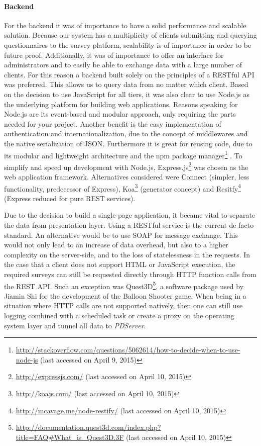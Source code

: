 	\paragraph{Backend}

		For the backend it was of importance to have a solid performance and scalable solution. Because our system has a multiplicity of clients submitting and querying questionnaires to the survey platform, scalability is of importance in order to be future proof. 		Additionally, it was of importance to offer an interface for administrators and to easily be able to exchange data with a large number of clients. For this reason a backend built solely on the principles of a RESTful API was preferred. This allows us to query data from no matter which client.
		Based on the decision to use JavaScript for all tiers, it was also clear to use Node.js as the underlying platform for building web applications. Reasons speaking for Node.js are its event-based and modular approach, only requiring the parts needed for your project. Another benefit is the easy implementation of authentication and internationalization, due to the concept of middlewares \cite{Heise2014RESTConnect} and the native serialization of JSON. Furthermore it is great for reusing code, due to its modular and lightweight architecture and the npm package manager\footnote{\url{http://stackoverflow.com/questions/5062614/how-to-decide-when-to-use-node-js} (last accessed on April 9, 2015)} \cite{Heise2014NodeProCon}. To simplify and speed up development with Node.js, Express.js\footnote{\url{http://expressjs.com/} (last accessed on April 10, 2015)} was chosen as the web application framework. Alternatives considered were Connect (simpler, less functionality, predecessor of Express), Koa\footnote{\url{http://koajs.com/} (last accessed on April 10, 2015)} (generator concept) and Resitfy\footnote{\url{http://mcavage.me/node-restify/} (last accessed on April 10, 2015)} (Express reduced for pure REST services). 

		Due to the decision to build a single-page application, it became vital to separate the data from presentation layer. Using a RESTful service is the current de facto standard. An alternative would be to use SOAP for message exchange. This would not only lead to an increase of data overhead, but also to a higher complexity on the server-side, and to the loss of statelessness in the requests. In the case that a client does not support HTML or JavaScript execution, the required surveys can still be requested directly through HTTP function calls from the REST API. Such an exception was Quest3D\footnote{\url{http://documentation.quest3d.com/index.php?title=FAQ\#What_is_Quest3D.3F} (last accessed on April 10, 2015)}, a software package used by Jiamin Shi for the development of the Balloon Shooter game. When being in a situation where HTTP calls are not supported natively, then one can still use logging combined with a scheduled task or create a proxy on the operating system layer and tunnel all data to \textit{PDServer}.





